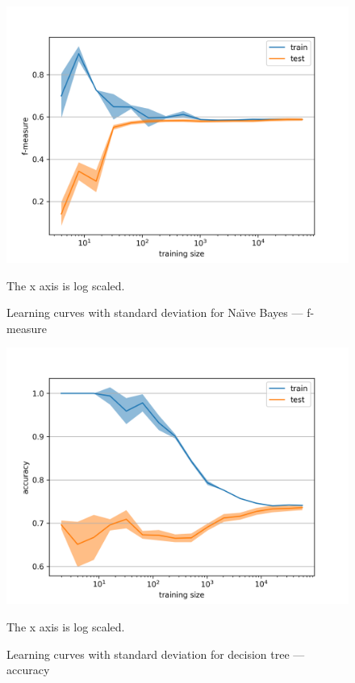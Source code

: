 \begin{figure}[h]\centering
\includegraphics[width=130mm]{figures/lc2_fm.png}
\caption{Learning curves with standard deviation for Na\"{\i}ve Bayes --- f-measure}\label{fig:l_curves2_f_measure}
The x axis is log scaled.
\end{figure}


\begin{figure}[h]\centering
\includegraphics[width=130mm]{figures/lc3_acc.png}
\caption{Learning curves with standard deviation for decision tree --- accuracy}\label{fig:l_curves3_accuracy}
The x axis is log scaled.
\end{figure}

